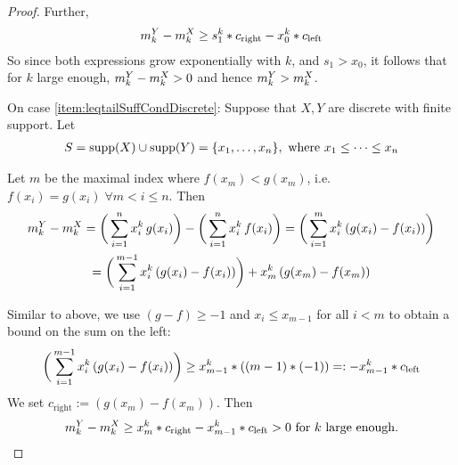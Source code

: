 \documentclass[a4paper]{scrreprt}
\DeclareMathOperator{\supp}{supp}
\begin{document}
\begin{proof}
        Further,
        \begin{gather*}
            m_k^Y - m_k^X
            \geq s_1^k * c_{\text{right}} - x_0^k * c_{\text{left}}
        \end{gather*}
        So since both expressions grow exponentially with $k$, and $s_1 > x_0$, it follows that for $k$ large enough, $m_k^Y - m_k^X > 0$ and hence $m_k^Y > m_k^X$.
        
        
        On case \ref{item:leqtailSuffCondDiscrete}: Suppose that $X, Y$ are discrete with finite support. Let 
        \begin{gather*}
            S = \supp(X) \cup \supp(Y) = \set{x_1, \dots, x_n}, \text{ where } x_1 \leq \dots \leq x_n
        \end{gather*}
        
        Let $m$ be the maximal index where $f(x_m) < g(x_m)$, i.e. $f(x_i) = g(x_i) \;\forall m < i \leq n$.
        Then
        \begin{multline*}
            m_k^Y - m_k^X
            = \bigg(\sum_{i=1}^{n} x_i^k \,g(x_i)\bigg) - \bigg(\sum_{i=1}^{n} x_i^k \,f(x_i)\bigg)
            = \bigg(\sum_{i=1}^{m} x_i^k \,(g(x_i) - f(x_i))\bigg) \\
            = \bigg(\sum_{i=1}^{m-1} x_i^k \,(g(x_i) - f(x_i))\bigg) + x_m^k \,(g(x_m) - f(x_m))
        \end{multline*}
        
        Similar to above, we use $(g -f) \geq -1$ and $x_i \leq x_{m-1}$ for all $i < m$ to obtain a bound on the sum on the left:
        \begin{gather*}
            \bigg(\sum_{i=1}^{m-1} x_i^k \,(g(x_i) - f(x_i))\bigg)
            \geq x_{m-1}^k * ((m-1) * (-1))
            =: -x_{m-1}^k * c_{\text{left}}
        \end{gather*}
        We set $c_{\text{right}} := (g(x_m) - f(x_m))$. Then
        \begin{gather*}
            m_k^Y - m_k^X \geq x_m^k * c_{\text{right}} -x_{m-1}^k * c_{\text{left}} > 0 \text{ for $k$ large enough.}
        \end{gather*}        
    \end{proof}
    
    
    
    
    
    
    
\end{document}
